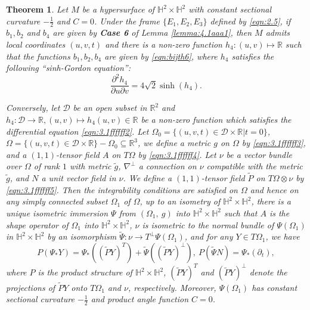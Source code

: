 \documentclass[reqno]{amsart}%
\newtheorem{theorem}{Theorem}[section]   %
\theoremstyle{definition}
\numberwithin{equation}{section}
\begin{document}
\begin{theorem}\label{thm:5.13a1}
Let $M$ be a hypersurface of $\mathbb{H}^2\times \mathbb{H}^2$ with constant sectional curvature $-\frac{1}{2}$ and $C=0$.
Under the frame $\{E_1,E_2,E_3\}$ defined by \eqref{eqn:2.5}, if $b_1,b_2$ and $b_4$ are
given by {\bf Case 6} of Lemma \ref{lemma:4.1aaa1}, then $M$ admits local coordinates $(u,v,t)$
and there is a non-zero function $h_4:(u,v)\mapsto \mathbb{R}$
such that the functions $b_1,b_2,b_4$ are given by \eqref{eqn:bijth6},
where $h_4$ satisfies the following ``sinh-Gordon equation'':
%
\begin{equation}\label{eqn:3.1ffffff2}
\frac{\partial^2 h_4}{\partial u \partial v}
=4\sqrt{2}\sinh(h_4).
\end{equation}

Conversely, let $\mathcal{D}$ be an open subset in $\mathbb{R}^2$ and $h_4:\mathcal{D}\to\mathbb{R}, (u,v)\mapsto h_4(u,v)\in\mathbb{R}$
be a non-zero function which satisfies the differential equation \eqref{eqn:3.1ffffff2}.
Let $\Omega_0=\{(u,v,t)\in \mathcal{D}\times \mathbb{R}|t=0\}$, $\Omega=\{(u,v,t)\in \mathcal{D}\times \mathbb{R}\}-\Omega_0\subseteq \mathbb{R}^3$, we define a metric $g$ on $\Omega$ by
\eqref{eqn:3.1ffffff3},
and a $(1,1)$-tensor field $A$ on $T\Omega$ by
\eqref{eqn:3.1ffffff4}.
Let $\nu$ be a vector bundle over  $\Omega$ of rank $1$ with metric $\tilde{g}$, $\nabla ^{\perp} $ a connection on $\nu$ compatible with the metric $\tilde{g}$, and $N$ a unit vector field in $\nu$.   We define a $(1,1)$-tensor field $\tilde{P}$ on $T\Omega\otimes \nu$ by
\eqref{eqn:3.1ffffff5}.
Then the integrability conditions are satisfied on $\Omega$ and hence on any simply
connected subset $\Omega_1$ of $\Omega$, up to an isometry of  $\mathbb{H}^2\times \mathbb{H}^2$, there is a unique isometric immersion $\Psi$ from $(\Omega_1,~g)$ into $\mathbb{H}^2\times \mathbb{H}^2$ such that $A$ is the shape operator of  $\Omega_1$ into $\mathbb{H}^2\times \mathbb{H}^2$, $\nu$ is isometric to the normal bundle of $\Psi(\Omega_1)$ in
$\mathbb{H}^2\times \mathbb{H}^2$ by an isomorphism $\tilde{\Psi}:\nu\to T^{\perp}\Psi(\Omega_1)$,
and for any $Y\in T\Omega_1$, we have
\begin{equation}
	P(\Psi_{*}Y)=\Psi_{*}((\tilde{P}Y)^{T})+\tilde{\Psi}((\tilde{P}Y)^{\perp}),~
	P(\tilde{\Psi}N)=\Psi_*(\partial_t),
\end{equation}
where $P$ is the product structure of $\mathbb{H}^2\times \mathbb{H}^2$, $(\tilde{P}Y)^{T}$ and $(\tilde{P}Y)^{\perp}$ denote the projections of  $\tilde{P}Y$ onto $T\Omega_1$ and $\nu$, respectively.
Moreover, $\Psi(\Omega_1)$ has constant sectional curvature $-\frac{1}{2}$ and product angle function $C=0$.
\end{theorem}
\end{document}
